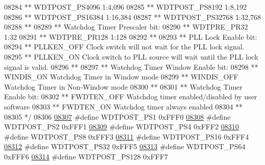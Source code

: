 \begin{DoxyCode}
{{{{08284 \textcolor{comment}{**     WDTPOST\_PS4096       1:4,096}
08285 \textcolor{comment}{**     WDTPOST\_PS8192       1:8,192}
08286 \textcolor{comment}{**     WDTPOST\_PS16384      1:16,384}
08287 \textcolor{comment}{**     WDTPOST\_PS32768      1:32,768}
08288 \textcolor{comment}{**}
08289 \textcolor{comment}{**   Watchdog Timer Prescaler bit:}
08290 \textcolor{comment}{**     WDTPRE\_PR32          1:32}
08291 \textcolor{comment}{**     WDTPRE\_PR128         1:128}
08292 \textcolor{comment}{**}
08293 \textcolor{comment}{**   PLL Lock Enable bit:}
08294 \textcolor{comment}{**     PLLKEN\_OFF           Clock switch will not wait for the PLL lock signal.}
08295 \textcolor{comment}{**     PLLKEN\_ON            Clock switch to PLL source will wait until the PLL lock signal is valid.}
08296 \textcolor{comment}{**}
08297 \textcolor{comment}{**   Watchdog Timer Window Enable bit:}
08298 \textcolor{comment}{**     WINDIS\_ON            Watchdog Timer in Window mode}
08299 \textcolor{comment}{**     WINDIS\_OFF           Watchdog Timer in Non-Window mode}
08300 \textcolor{comment}{**}
08301 \textcolor{comment}{**   Watchdog Timer Enable bit:}
08302 \textcolor{comment}{**     FWDTEN\_OFF           Watchdog timer enabled/disabled by user software}
08303 \textcolor{comment}{**     FWDTEN\_ON            Watchdog timer always enabled}
08304 \textcolor{comment}{**}
08305 \textcolor{comment}{*/}
08306 
\hypertarget{a00009_source_l08307}{}\hyperlink{a00009_a3b907f60df72efec74b7ea17871243df}{08307} \textcolor{preprocessor}{#define WDTPOST\_PS1          0xFFF0}
\hypertarget{a00009_source_l08308}{}\hyperlink{a00009_a2ffa2fd8be792a7d45ca309eb9e94d83}{08308} \textcolor{preprocessor}{#define WDTPOST\_PS2          0xFFF1}
\hypertarget{a00009_source_l08309}{}\hyperlink{a00009_aedb9acb2d50d0d000a1f6682fdcacba0}{08309} \textcolor{preprocessor}{#define WDTPOST\_PS4          0xFFF2}
\hypertarget{a00009_source_l08310}{}\hyperlink{a00009_af4c27494e74759f053e8762756425243}{08310} \textcolor{preprocessor}{#define WDTPOST\_PS8          0xFFF3}
\hypertarget{a00009_source_l08311}{}\hyperlink{a00009_af4aab98db5d51e73e5e473deb703f7e6}{08311} \textcolor{preprocessor}{#define WDTPOST\_PS16         0xFFF4}
\hypertarget{a00009_source_l08312}{}\hyperlink{a00009_a682aecd2100f22de0b6c1e843874339f}{08312} \textcolor{preprocessor}{#define WDTPOST\_PS32         0xFFF5}
\hypertarget{a00009_source_l08313}{}\hyperlink{a00009_af7a76ceecb22cd92cd42307c8a369678}{08313} \textcolor{preprocessor}{#define WDTPOST\_PS64         0xFFF6}
\hypertarget{a00009_source_l08314}{}\hyperlink{a00009_ac9063d72654b81f2ba0ec2d6c71279db}{08314} \textcolor{preprocessor}{#define WDTPOST\_PS128        0xFFF7}
}}}}
\end{DoxyCode}
